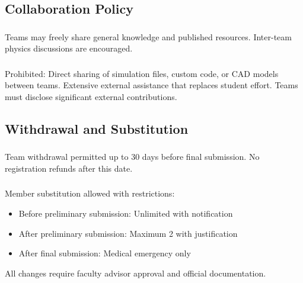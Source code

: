 \subsection{Collaboration Policy}

\subsubsection{}
Teams may freely share general knowledge and published resources. Inter-team physics discussions are encouraged.

\subsubsection{}
Prohibited: Direct sharing of simulation files, custom code, or CAD models between teams. Extensive external assistance that replaces student effort. Teams must disclose significant external contributions.

\subsection{Withdrawal and Substitution}

\subsubsection{}
Team withdrawal permitted up to 30 days before final submission. No registration refunds after this date.

\subsubsection{}
Member substitution allowed with restrictions:
\begin{itemize}[noitemsep]
    \item Before preliminary submission: Unlimited with notification
    \item After preliminary submission: Maximum 2 with justification
    \item After final submission: Medical emergency only
\end{itemize}

All changes require faculty advisor approval and official documentation.